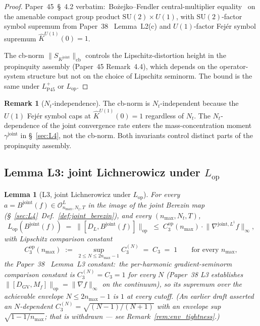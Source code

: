 \documentclass[11pt,a4paper]{article}
\theoremstyle{plain}
\newtheorem{lemma}[theorem]{Lemma}
\theoremstyle{definition}
\newtheorem{remark}[theorem]{Remark}
\newcommand{\nmax}{n_{\max}}
\newcommand{\Nt}{N_{t}}
\newcommand{\Op}{\mathcal{O}}
\newcommand{\opnorm}[1]{\lVert #1 \rVert_{\mathrm{op}}}
\newcommand{\cbnorm}[1]{\lVert #1 \rVert_{\mathrm{cb}}}
\newcommand{\norm}[1]{\lVert #1 \rVert}
\newcommand{\SU}{\mathrm{SU}}
\newcommand{\Uone}{U(1)}
\newcommand{\DGV}{D_{\mathrm{GV}}}
\newcommand{\DL}{D_{L}}
\newcommand{\Lop}{L_{\mathrm{op}}}
\newcommand{\LPwk}{L^{+}_{\mathrm{P45}}}
\newcommand{\Bjoint}{B^{\mathrm{joint}}}
\newcommand{\Kjoint}{K^{\mathrm{joint}}}
\newcommand{\gammajoint}{\gamma^{\mathrm{joint}}}
\newcommand{\Cthreeop}{C_{3}^{\mathrm{op}}}
\newcommand{\Plancherel}{\hat}
\begin{document}
\begin{proof}
Paper~45~\S~4.2 verbatim:\ Bo\.zejko--Fendler central-multiplier
equality~\cite{bozejko_fendler1991,pisier2001} on the amenable compact
group product $\SU(2) \times \Uone$, with $\SU(2)$-factor symbol
supremum from Paper~38~\cite{paper38} Lemma~L2(c) and $\Uone$-factor
Fej\'er symbol supremum $\Plancherel{K}^{\Uone}(0) = 1$.

The cb-norm $\cbnorm{S_{\Kjoint}}$ controls the Lipschitz-distortion
height in the propinquity assembly (Paper~45 Remark~4.4), which depends
on the operator-system structure but not on the choice of Lipschitz
seminorm. The bound is the same under $\LPwk$ or $\Lop$. \qedhere
\end{proof}

\begin{remark}[$\Nt$-independence]\label{rem:Nt_independent_cb}
The cb-norm is $\Nt$-independent because the $\Uone$ Fej\'er symbol
caps at $\Plancherel{K}^{\Uone}(0) = 1$ regardless of $\Nt$. The
$\Nt$-dependence of the joint convergence rate enters the
mass-concentration moment $\gammajoint$ in \S~\ref{sec:L4}, not the
cb-norm. Both invariants control distinct parts of the propinquity
assembly.
\end{remark}

\subsection{Lemma L3: joint Lichnerowicz under $\Lop$}\label{sec:L3}

\begin{lemma}[L3, joint Lichnerowicz under $\Lop$]\label{lem:L3op}
For every $a = \Bjoint(f) \in \Op^{L}_{\nmax, \Nt, T}$ in the image of
the joint Berezin map (\S~\ref{sec:L4}~Def.~\ref{def:joint_berezin}),
and every $(\nmax, \Nt, T)$,
\begin{equation}\label{eq:L3op_main}
   \Lop(\Bjoint(f)) \;=\; \opnorm{[\DL, \Bjoint(f)]}
   \;\le\; \Cthreeop(\nmax) \cdot \norm{\nabla^{\mathrm{joint}, L^{1}} f}_{\infty},
\end{equation}
with Lipschitz comparison constant
\begin{equation}\label{eq:C3op_closed_form}
   \Cthreeop(\nmax)
   \;:=\; \sup_{2 \le N \le 2\nmax - 1} C_{3}^{(N)}
   \;=\; C_{3} \;=\; 1
   \qquad \text{for every } \nmax,
\end{equation}
the Paper~38~\cite{paper38} Lemma~L3 constant:\ the per-harmonic
\emph{gradient}-seminorm comparison constant is $C_{3}^{(N)} = C_{3} = 1$
for every $N$ (Paper~38 L3 establishes $\opnorm{[\DGV, M_{f}]} =
\norm{\nabla f}_{\infty}$ on the continuum), so its supremum over the
achievable envelope $N \le 2\nmax - 1$ is $1$ at every cutoff. (An earlier
draft asserted an $N$-dependent $C_{3}^{(N)} = \sqrt{(N-1)/(N+1)}$ with an
envelope sup $\sqrt{1 - 1/\nmax}$; that is withdrawn ---
see Remark~\ref{rem:env_tightness}.)
\end{lemma}
\end{document}
